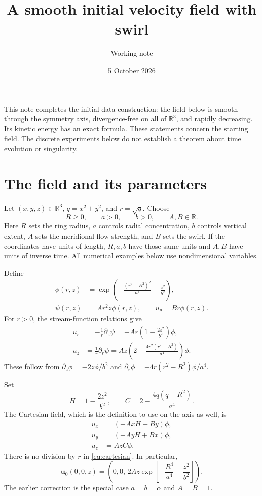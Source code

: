 \documentclass[11pt]{article}
\title{A smooth initial velocity field with swirl}
\author{Working note}
\date{5 October 2026}
\newcommand{\R}{\mathbb R}
\newcommand{\uu}{\mathbf u_0}
\begin{document}
\maketitle

This note completes the initial-data construction: the field below is smooth
through the symmetry axis, divergence-free on all of $\R^3$, and rapidly
decreasing. Its kinetic energy has an exact formula. These statements concern
the starting field. The discrete experiments below do not establish a theorem
about time evolution or singularity.

\section{The field and its parameters}

Let $(x,y,z)\in\R^3$, $q=x^2+y^2$, and $r=\sqrt q$. Choose
\[
R\geq0,\qquad a>0,\qquad b>0,\qquad A,B\in\R.
\]
Here $R$ sets the ring radius, $a$ controls radial concentration, $b$ controls
vertical extent, $A$ sets the meridional flow strength, and $B$ sets the swirl.
If the coordinates have units of length, $R,a,b$ have those same units and
$A,B$ have units of inverse time. All numerical examples below use
nondimensional variables.

Define
\begin{align}
\phi(r,z)&=\exp\!\left(-\frac{(r^2-R^2)^2}{a^4}-\frac{z^2}{b^2}\right),
\\
\psi(r,z)&=A r^2z\phi(r,z),\qquad u_\theta=B r\phi(r,z).
\end{align}
For $r>0$, the stream-function relations give
\begin{align}
u_r&=-\frac1r\partial_z\psi
     =-A r\left(1-\frac{2z^2}{b^2}\right)\phi,\\
u_z&=\frac1r\partial_r\psi
     =A z\left(2-\frac{4r^2(r^2-R^2)}{a^4}\right)\phi.
\end{align}
These follow from
$\partial_z\phi=-2z\phi/b^2$ and
$\partial_r\phi=-4r(r^2-R^2)\phi/a^4$.

Set
\[
H=1-\frac{2z^2}{b^2},\qquad
C=2-\frac{4q(q-R^2)}{a^4}.
\]
The Cartesian field, which is the definition to use on the axis as well, is
\begin{equation}\label{eq:cartesian}
\boxed{
\begin{aligned}
u_x&=(-A xH-B y)\phi,\\
u_y&=(-A yH+B x)\phi,\\
u_z&=A zC\phi.
\end{aligned}}
\end{equation}
There is no division by $r$ in \eqref{eq:cartesian}. In particular,
\[
\uu(0,0,z)=
\left(0,0,\,2Az\exp\!\left[-\frac{R^4}{a^4}-\frac{z^2}{b^2}\right]\right).
\]
The earlier correction is the special case $a=b=\alpha$ and $A=B=1$.
\end{document}
